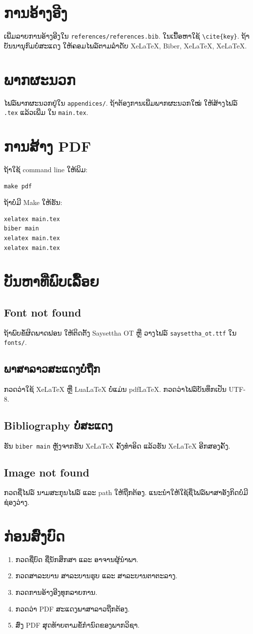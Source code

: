 \documentclass{../thesis}
\begin{document}
\chapter{ການອ້າງອີງ}
ເພີ່ມລາຍການອ້າງອີງໃນ \texttt{references/references.bib}. ໃນເນື້ອຫາໃຊ້ \verb|\cite{key}|. ຖ້າບັນນານຸກົມບໍ່ສະແດງ ໃຫ້ຄອມໄພລ໌ຕາມລຳດັບ XeLaTeX, Biber, XeLaTeX, XeLaTeX.

\chapter{ພາກຜະນວກ}
ໄຟລ໌ພາກຜະນວກຢູ່ໃນ \texttt{appendices/}. ຖ້າຕ້ອງການເພີ່ມພາກຜະນວກໃໝ່ ໃຫ້ສ້າງໄຟລ໌ \texttt{.tex} ແລ້ວເພີ່ມ \verb|| ໃນ \texttt{main.tex}.

\chapter{ການສ້າງ PDF}
ຖ້າໃຊ້ command line ໃຫ້ພິມ:
\begin{verbatim}
make pdf
\end{verbatim}
ຖ້າບໍ່ມີ Make ໃຫ້ຮັນ:
\begin{verbatim}
xelatex main.tex
biber main
xelatex main.tex
xelatex main.tex
\end{verbatim}

\chapter{ບັນຫາທີ່ພົບເລື້ອຍ}
\section{Font not found}
ຖ້າພົບຂໍ້ຜິດພາດຟອນ ໃຫ້ຕິດຕັ້ງ Saysettha OT ຫຼື ວາງໄຟລ໌ \texttt{saysettha\_ot.ttf} ໃນ \texttt{fonts/}.

\section{ພາສາລາວສະແດງບໍ່ຖືກ}
ກວດວ່າໃຊ້ XeLaTeX ຫຼື LuaLaTeX ບໍ່ແມ່ນ pdfLaTeX. ກວດວ່າໄຟລ໌ບັນທຶກເປັນ UTF-8.

\section{Bibliography ບໍ່ສະແດງ}
ຮັນ \texttt{biber main} ຫຼັງຈາກຮັນ XeLaTeX ຄັ້ງທຳອິດ ແລ້ວຮັນ XeLaTeX ອີກສອງຄັ້ງ.

\section{Image not found}
ກວດຊື່ໄຟລ໌ ນາມສະກຸນໄຟລ໌ ແລະ path ໃຫ້ຖືກຕ້ອງ. ແນະນຳໃຫ້ໃຊ້ຊື່ໄຟລ໌ພາສາອັງກິດບໍ່ມີຊ່ອງວ່າງ.

\chapter{ກ່ອນສົ່ງບົດ}
\begin{enumerate}
  \item ກວດຊື່ບົດ ຊື່ນັກສຶກສາ ແລະ ອາຈານຜູ້ນຳພາ.
  \item ກວດສາລະບານ ສາລະບານຮູບ ແລະ ສາລະບານຕາຕະລາງ.
  \item ກວດການອ້າງອີງທຸກລາຍການ.
  \item ກວດວ່າ PDF ສະແດງພາສາລາວຖືກຕ້ອງ.
  \item ສົ່ງ PDF ສຸດທ້າຍຕາມຂໍ້ກຳນົດຂອງພາກວິຊາ.
\end{enumerate}
\end{document}

